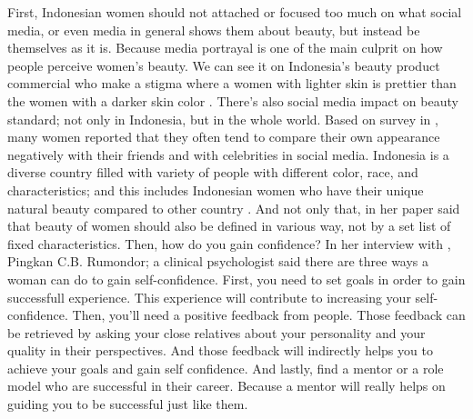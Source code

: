 \documentclass[12pt]{article}
\begin{document}
\begin{refsection}
    First, Indonesian women should not attached or focused too much on what social
    media, or even media in general shows them about beauty, but instead be themselves
    as it is. Because media portrayal is one of the main culprit on how people 
    perceive women's beauty. We can see it on Indonesia's beauty product
    commercial who make a stigma where a women with lighter skin is prettier than
    the women with a darker skin color \parencite{prianti2013indonesian}. There's also social media impact on
    beauty standard; not only in Indonesia, but in the whole world. Based on 
    \citeauthor{fardoulyNegativeComparisonsOne2015} survey in \citeyear{fardoulyNegativeComparisonsOne2015},
    many women reported that they often tend to compare their own appearance
    negatively with their friends and with celebrities in social media. 
    Indonesia is a diverse country filled with variety of people with different
    color, race, and characteristics; and this includes Indonesian women who have
    their unique natural beauty compared to other country \parencite{wirasariKAJIANKECANTIKANKAUM2016}.
    And not only that, \citeauthor{prianti2013indonesian} in her paper said that 
    beauty of women should also be defined in various way, not by a set list
    of fixed characteristics.
    Then, how do you gain confidence? In her interview with
    \citeauthor{kumparanwomanBagaimanaCaraMeningkatkan2019}, Pingkan C.B. Rumondor;
    a clinical psychologist said there are three ways a woman can do to gain self-confidence.
    First, you need to set goals in order to gain successfull experience. This 
    experience will contribute to increasing your self-confidence. Then, you'll 
    need a positive feedback from people. Those feedback can be retrieved by asking
    your close relatives about your personality and your quality in their perspectives.
    And those feedback will indirectly helps you to achieve your goals and gain
    self confidence. And lastly, find a mentor or a role model who are successful
    in their career. Because a mentor will really helps on guiding you to be 
    successful just like them.
    

\end{refsection}
\end{document}

